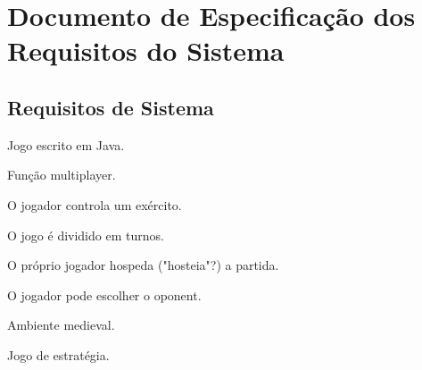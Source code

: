 \section{Documento de Especificação dos Requisitos do Sistema}

\subsection{Requisitos de Sistema}

\begin{itemise}
    \item Jogo escrito em Java.
    \item Função multiplayer.
    \item O jogador controla um exército.
    \item O jogo é dividido em turnos.
    \item O próprio jogador hospeda ("hosteia"?) a partida.
    \item O jogador pode escolher o oponent.
    \item Ambiente medieval.
    \item Jogo de estratégia.
   
\end{itemise}